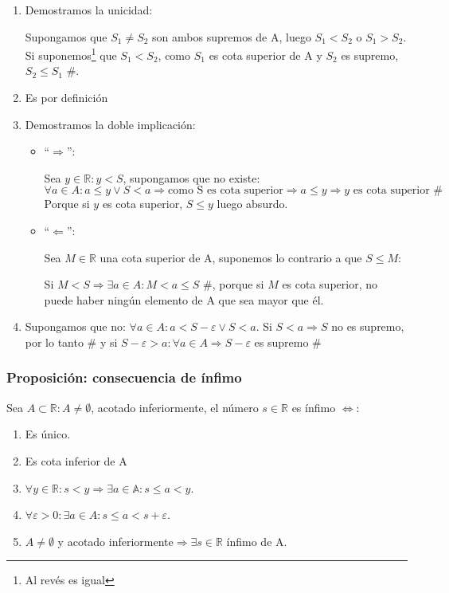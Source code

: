 \documentclass[10pt,a4paper,openright]{book}
\begin{document}
\begin{enumerate}

\item Demostramos la unicidad:\par
Supongamos que $S_1\neq S_2$ son ambos supremos de A, luego $S_1<S_2$ o $S_1>S_2$. Si suponemos\footnote{Al revés es igual} que $S_1<S_2$, como $S_1$ es cota superior de A y $S_2$ es supremo, $S_2\leq S_1$ \#.

\item Es por definición

\item Demostramos la doble implicación:
	\begin{itemize}
	\item ``$\Rightarrow$'':\par
	Sea $y\in \mathbb R: y<S$, supongamos que no existe:
	$$\forall a \in A: a\leq y \vee S<a\Rightarrow \mbox{como S es cota superior}\Rightarrow a\leq y\Rightarrow y \mbox{ es cota superior \#}$$
	Porque si $y$ es cota superior, $S\leq y$ luego absurdo.
	
	\item ``$\Leftarrow$'':\par
	Sea $M\in \mathbb R$ una cota superior de A, suponemos lo contrario a que $S\leq M$:\par
	Si $M<S\Rightarrow \exists a\in A: M<a\leq S$ \#, porque si $M$ es cota superior, no puede haber ningún elemento de A que sea mayor que él.
	\end{itemize}
	
\item Supongamos que no: $\forall a \in A: a<S-\varepsilon \vee S< a$. Si $S<a\Rightarrow S$ no es supremo, por lo tanto \# y si $S-\varepsilon> a: \forall a \in A\Rightarrow S-\varepsilon$ es supremo \#
\end{enumerate}

\subsubsection*{Proposición: consecuencia de ínfimo}
Sea $A\subset \mathbb R: A\neq \emptyset$, acotado inferiormente, el número $s\in \mathbb R$ es ínfimo $\Leftrightarrow$:
\begin{enumerate}
\item  Es único.
\item Es cota inferior de A
\item $\forall y\in \mathbb R: s<y\Rightarrow \exists a\in \mathbb A: s\leq a<y$.
\item $\forall \varepsilon>0: \exists a\in A: s\leq a<s+\varepsilon$.
\item $A\neq \emptyset$ y acotado inferiormente$\Rightarrow \exists s\in \mathbb R$ ínfimo de A.
\end{enumerate}
\end{document}
